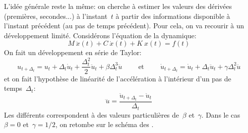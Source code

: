 L'idée générale reste la même: on cherche à estimer les valeurs des dérivées (premières, secondes...) à l'instant~$t$ à partir des informations disponible à l'instant précédent (au pas de temps précédent). Pour cela, on va recourir à un développement limité. Considérons l'équation de la dynamique:
\begin{equation}
M\ \ddot x(t) + C\ \dot x(t) + K\ x(t)= f(t)
\end{equation}
On fait un développement en série de Taylor: 
\begin{equation}
u_{t+\Delta_t}=u_t+\Delta_t \dot{u}_t+\frac{\Delta_t^2}2\ddot{u}_t+\beta\Delta_t^3\dddot{u} \qquad\text{ et }\qquad \dot{u}_{t+\Delta_t} = \dot{u}_t+\Delta_t\ddot{u}_t+\gamma\Delta_t^2\dddot{u}
\end{equation}
et on fait l'hypothèse de linéarité de l'accélération à l'intérieur d'un pas de temps~$\Delta_t$:
\begin{equation}
\dddot{u}=\dfrac{\ddot{u}_{t+\Delta_t}-\ddot{u}_t}{\Delta_t}
\end{equation}
Les différents  correspondent à des valeurs particulières de~$\beta$ et~$\gamma$. Dans le cas~$\beta=0$ et~$\gamma=1/2$, on retombe sur le schéma des . 

